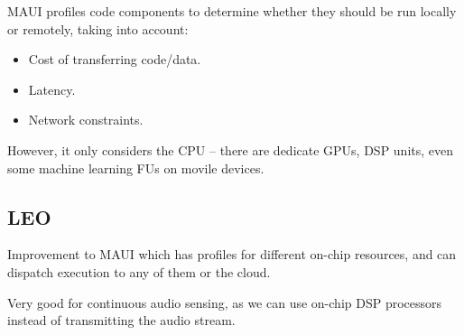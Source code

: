\documentclass[a4paper, 11pt]{article}
\begin{document}
{{        MAUI profiles code components to determine whether they should be run locally or remotely, taking into account:
        \begin{itemize}
        \item Cost of transferring code/data.
        \item Latency.
        \item Network constraints.
        \end{itemize}

        However, it only considers the CPU -- there are dedicate GPUs, DSP units, even some machine learning FUs on movile devices.
    }
    \subsection*{LEO}
    {
        Improvement to MAUI which has profiles for different on-chip resources, and can dispatch execution to any of them or the cloud.

        Very good for continuous audio sensing, as we can use on-chip DSP processors instead of transmitting the audio stream.
    }
}
\end{document}
